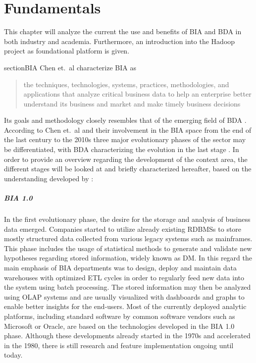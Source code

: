 \chapter{Fundamentals}
\label{chap:fund}
This chapter will analyze the current the use and benefits of \ac{BIA} and \ac{BDA} in both industry and academia. Furthermore, an introduction into the Hadoop project as foundational platform is given. 

section{\acl{BIA}}
\label{sota-bia}
Chen et.~al characterize \ac{BIA} as \blockcquote[p.~1166]{chen2012business}{the techniques, technologies, systems, practices, methodologies, and applications that analyze critical business data to help an enterprise better understand its business and market and make timely business decisions}. Its goals and methodology closely resembles that of the emerging field of \ac{BDA} \autocite[p.~1166]{chen2012business}.
According to Chen et.~al and their involvement in the \ac{BIA} space from the end of the last century to the 2010s three major evolutionary phases of the sector may be differentiated, with \ac{BDA} characterizing the evolution in the last stage \autocite[][p.~1168 \psqq]{chen2012business}. In order to provide an overview regarding the development of the context area, the different stages will be looked at and briefly characterized hereafter, based on the understanding developed by \textcite[p.~1166 \psqq]{chen2012business}:

\paragraph{\ac{BIA} 1.0} In the first evolutionary phase, the desire for the storage and analysis of business data emerged. Companies started to utilize already existing \acp{RDBMS} to store mostly structured data collected from various legacy systems such as mainframes. This phase includes the usage of statistical methods to generate and validate new hypotheses regarding stored information, widely known as \ac{DM}. In this regard the main emphasis of \ac{BIA} departments was to design, deploy and maintain data warehouses with optimized \ac{ETL} cycles in order to regularly feed new data into the system using batch processing. The stored information may then be analyzed using \ac{OLAP} systems and are usually visualized with dashboards and graphs to enable better insights for the end-users.
Most of the currently deployed analytic platforms, including standard software by common software vendors such as Microsoft or Oracle, are based on the technologies developed in the \ac{BIA} 1.0 phase. Although these developments already started in the 1970s and accelerated in the 1980, there is still research and feature implementation ongoing until today.

